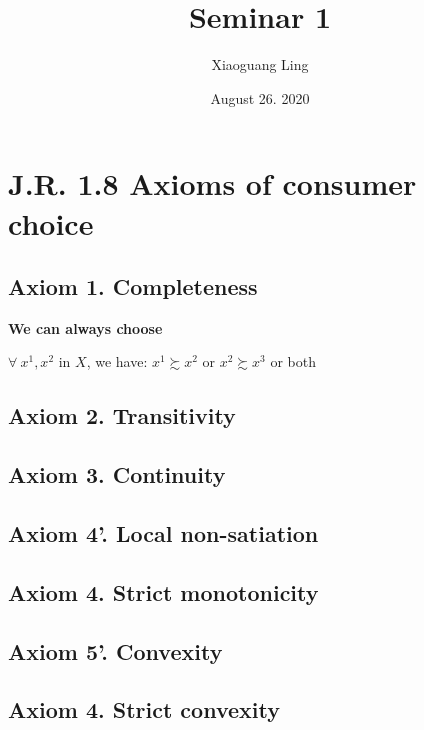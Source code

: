 \documentclass{article}
\title{Seminar 1}
\author{Xiaoguang Ling }
\date{August 26. 2020}
\begin{document}
\maketitle

\section{J.R. 1.8 Axioms of consumer choice}

\subsection{Axiom 1. Completeness}
\textbf{We can always choose}

$\forall \ x^1, x^2$ in $X$, we have: $x^1 \succsim  x^2$ or $x^2 \succsim  x^3$  or both

\subsection{Axiom 2. Transitivity}


\subsection{Axiom 3. Continuity}


\subsection{Axiom 4'. Local non-satiation}

\subsection{Axiom 4. Strict monotonicity}

\subsection{Axiom 5'. Convexity}

\subsection{Axiom 4. Strict convexity}
\end{document}
